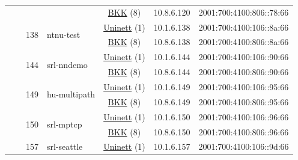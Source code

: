 \begin{small}
\begin{center}
\begin{longtable}{|c|c|c|c|c|c|c|c|}
  &  &  &  & \multicolumn{2}{|c|}{\tiny{\href{http://bkk.no}{BKK} (8)}} & \tiny{10.8.6.120} & \tiny{2001:700:4100:806::78:66} \\* \cline{3-3}\cline{4-4}\cline{5-5}\cline{6-6}\cline{7-7}\cline{8-8}
  &  & \multirow{2}{*}{\tiny{138}} & \multicolumn{1}{|l|}{\multirow{2}{*}{\tiny{ntnu-test}}} & \multicolumn{2}{|c|}{\tiny{\href{https://www.uninett.no}{Uninett} (1)}} & \tiny{10.1.6.138} & \tiny{2001:700:4100:106::8a:66} \\* \cline{5-5}\cline{6-6}\cline{7-7}\cline{8-8}
  &  &  &  & \multicolumn{2}{|c|}{\tiny{\href{http://bkk.no}{BKK} (8)}} & \tiny{10.8.6.138} & \tiny{2001:700:4100:806::8a:66} \\* \cline{3-3}\cline{4-4}\cline{5-5}\cline{6-6}\cline{7-7}\cline{8-8}
  &  & \multirow{2}{*}{\tiny{144}} & \multicolumn{1}{|l|}{\multirow{2}{*}{\tiny{srl-nndemo}}} & \multicolumn{2}{|c|}{\tiny{\href{https://www.uninett.no}{Uninett} (1)}} & \tiny{10.1.6.144} & \tiny{2001:700:4100:106::90:66} \\* \cline{5-5}\cline{6-6}\cline{7-7}\cline{8-8}
  &  &  &  & \multicolumn{2}{|c|}{\tiny{\href{http://bkk.no}{BKK} (8)}} & \tiny{10.8.6.144} & \tiny{2001:700:4100:806::90:66} \\* \cline{3-3}\cline{4-4}\cline{5-5}\cline{6-6}\cline{7-7}\cline{8-8}
  &  & \multirow{2}{*}{\tiny{149}} & \multicolumn{1}{|l|}{\multirow{2}{*}{\tiny{hu-multipath}}} & \multicolumn{2}{|c|}{\tiny{\href{https://www.uninett.no}{Uninett} (1)}} & \tiny{10.1.6.149} & \tiny{2001:700:4100:106::95:66} \\* \cline{5-5}\cline{6-6}\cline{7-7}\cline{8-8}
  &  &  &  & \multicolumn{2}{|c|}{\tiny{\href{http://bkk.no}{BKK} (8)}} & \tiny{10.8.6.149} & \tiny{2001:700:4100:806::95:66} \\* \cline{3-3}\cline{4-4}\cline{5-5}\cline{6-6}\cline{7-7}\cline{8-8}
  &  & \multirow{2}{*}{\tiny{150}} & \multicolumn{1}{|l|}{\multirow{2}{*}{\tiny{srl-mptcp}}} & \multicolumn{2}{|c|}{\tiny{\href{https://www.uninett.no}{Uninett} (1)}} & \tiny{10.1.6.150} & \tiny{2001:700:4100:106::96:66} \\* \cline{5-5}\cline{6-6}\cline{7-7}\cline{8-8}
  &  &  &  & \multicolumn{2}{|c|}{\tiny{\href{http://bkk.no}{BKK} (8)}} & \tiny{10.8.6.150} & \tiny{2001:700:4100:806::96:66} \\* \cline{3-3}\cline{4-4}\cline{5-5}\cline{6-6}\cline{7-7}\cline{8-8}
  &  & \multirow{2}{*}{\tiny{157}} & \multicolumn{1}{|l|}{\multirow{2}{*}{\tiny{srl-seattle}}} & \multicolumn{2}{|c|}{\tiny{\href{https://www.uninett.no}{Uninett} (1)}} & \tiny{10.1.6.157} & \tiny{2001:700:4100:106::9d:66} \\* \cline{5-5}\cline{6-6}\cline{7-7}\cline{8-8}

\end{longtable}
\end{center}
\end{small}
